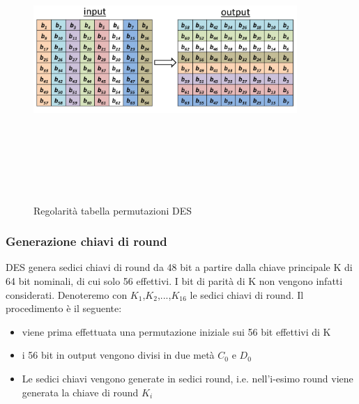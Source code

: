 \begin{figure}[htbp]
	\centering%
	\subfigure%
	{\includegraphics[height=10cm, width=10cm, keepaspectratio]{Immagini/chiave_segreta/des_perm_2.png}}
	\caption{Regolarità tabella permutazioni DES \label{fig:des_perm_2}} 	
\end{figure}

\subsubsection{Generazione chiavi di round}
DES genera sedici chiavi di round da 48 bit a partire dalla chiave principale K di 64 bit nominali, di cui solo 56 effettivi. I bit di parità di K non vengono infatti considerati. Denoteremo con $K_{1}$,$K_{2}$,...,$K_{16}$ le sedici chiavi di round. Il procedimento è il seguente:
\begin{itemize}
  \item viene prima effettuata una permutazione iniziale sui 56 bit effettivi di K
  \item i 56 bit in output vengono divisi in due metà $C_{0}$ e $D_{0}$
  \item Le sedici chiavi vengono generate in sedici round, i.e. nell'i-esimo round viene generata la chiave di round $K_{i}$
\end{itemize}

